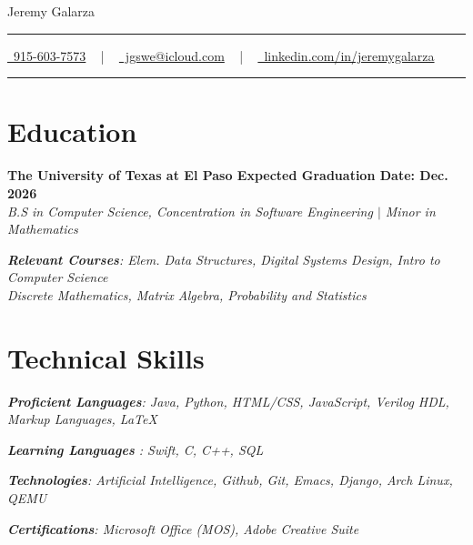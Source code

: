 \documentclass[letterpaper,10pt]{article}
\newcommand{\documentTitle}[2]{
  \begin{center}
    {\Huge\color{accentTitle} #1}
    \vspace{10pt}
    {\color{accentLine} \hrule}
    \vspace{2pt}
    \footnotesize{#2}
    \vspace{2pt}
    {\color{accentLine} \hrule}
  \end{center}
}
\newcommand{\heading}[2]{
  \hspace{10pt}#1\hfill#2\\
}
\newcommand{\headingBf}[2]{
  \heading{\textbf{#1}}{\textbf{#2}}
}
\newcommand{\headingIt}[2]{
  \heading{\textit{#1}}{\textit{#2}}
}
\begin{document}

  \documentTitle{Jeremy Galarza}{
    \href{tel:9156037573}{
      \raisebox{-0.05\height} \faPhone\ 915-603-7573} ~ | ~
    \href{mailto:jgswe@icloud.com}{
      \raisebox{-0.15\height} \faEnvelope\ jgswe@icloud.com} ~ | ~
    \href{www.linkedin.com/in/jeremygalarza}{
      \raisebox{-0.15\height} \faLinkedin\ linkedin.com/in/jeremygalarza} 
  }


\vspace{0pt}
  \section{Education}
  \headingBf{The University of Texas at El Paso \hspace{7.5cm}Expected Graduation Date: Dec. 2026}{}
  \headingIt{B.S in Computer Science, Concentration in Software Engineering $|$ Minor in Mathematics \hspace{7.9cm}}{}
  \vspace{3pt}
  \headingIt{\textbf{Relevant Courses}: Elem. Data Structures, Digital Systems Design, Intro to Computer Science
  \\\hspace{0.3cm}Discrete Mathematics, Matrix Algebra, Probability and Statistics}{}
  \vspace{-2pt}
  
\vspace{0pt}
  \section{Technical Skills}
    \headingIt{\textbf{Proficient Languages}: Java, Python, HTML/CSS, JavaScript, Verilog HDL, Markup Languages, LaTeX}{}
    \vspace{1pt}
    \headingIt{\textbf{Learning Languages }: Swift, C, C++, SQL}{}
    \vspace{1pt}
    \headingIt{\textbf{Technologies}: Artificial Intelligence, Github, Git, Emacs, Django, Arch Linux, QEMU}{}
    \vspace{2pt}
    \headingIt{\textbf{Certifications}: Microsoft Office (MOS), Adobe Creative Suite }{}
  

\vspace{0pt}
\end{document}
